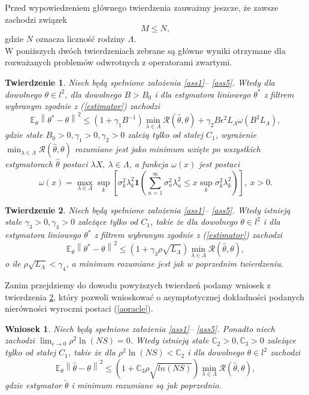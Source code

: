 \documentclass{mwart}
\newtheorem{tw}{Twierdzenie}
\newtheorem{wn}{Wniosek}
\newcommand{\norm}[1]{\left\lVert#1\right\rVert}
\begin{document}
Przed wypowiedzeniem głównego twierdzenia zauważmy jeszcze, że zawsze zachodzi związek
\begin{displaymath}
M\leq N,
\end{displaymath}
gdzie $N$ oznacza liczność rodziny $\Lambda$.\\
W poniższych dwóch twierdzeniach zebrane są główne wyniki otrzymane dla rozważanych problemów odwrotnych z operatorami zwartymi.
\begin{tw}\label{glowny1}
Niech będą spełnione założenia \ref{ass1}-- \ref{ass5}. Wtedy dla dowolnego $\theta\in l^2$, dla dowolnego $B>B_0$ i dla estymatora liniowego $\theta^*$ z filtrem wybranym zgodnie z (\ref{estimator}) zachodzi
\begin{displaymath}
\mathbb{E}_{\theta}\norm{\theta^*-\theta}^2\leq (1+\gamma_1B^{-1})\min_{\lambda\in \Lambda}\mathcal{R}(\hat{\theta},\theta)+\gamma_2B\epsilon^2L_{\Lambda}\omega(B^2L_{\Lambda}),
\end{displaymath}
gdzie stałe $B_0>0,\gamma_1>0,\gamma_2>0$ zależą tylko od stałej $C_1$, wyrażenie $\min_{\lambda\in \Lambda}\mathcal{R}(\hat{\theta},\theta)$ rozumiane jest jako minimum wzięte po wszystkich estymatorach $\hat{\theta}$ postaci $\lambda X,\ \lambda\in \Lambda$, a funkcja $\omega(x)$ jest postaci
\begin{displaymath}
\omega(x)=\max_{\lambda\in \Lambda}\sup_k\left[\sigma_k^2\lambda_k^2\pmb{1}\left(\sum_{n=1}^{\infty}\sigma_n^2\lambda_n^2\leq x \sup_k\sigma_k^2\lambda_k^2\right)\right],\ x>0.
\end{displaymath}
\end{tw}
\begin{tw}\label{glowny2}
Niech będą spełnione założenia \ref{ass1}-- \ref{ass5}. Wtedy istnieją stałe $\gamma_3>0,\gamma_4>0$ zależące tylko od $C_1$, takie że dla dowolnego $\theta\in l^2$ i dla estymatora liniowego $\theta^*$ z filtrem wybranym zgodnie z (\ref{estimator}) zachodzi
\begin{displaymath}
\mathbb{E}_{\theta}\norm{\theta^*-\theta}^2\leq (1+\gamma_3\rho\sqrt{L_{\Lambda}})\min_{\lambda\in \Lambda}\mathcal{R}(\hat{\theta},\theta),
\end{displaymath}
o ile $\rho\sqrt{L_{\Lambda}}<\gamma_4$, a minimum rozumiane jest jak w poprzednim twierdzeniu.
\end{tw}
Zanim przejdziemy do dowodu powyższych twierdzeń podamy wniosek z twierdzenia \ref{glowny2}, który pozwoli wnioskować o asymptotycznej dokładności podanych nierówności wyroczni postaci (\ref{aoracle}).
\begin{wn}
Niech będą spełnione założenia \ref{ass1}-- \ref{ass5}. Ponadto niech zachodzi $\lim_{\epsilon\to 0}\rho^2\ln(NS)=0$. Wtedy istnieją stałe $\mathbb{C}_2>0,\mathbb{C}_3>0$ zależące tylko od stałej $C_1$, takie że dla $\rho^2\ln(NS)<\mathbb{C}_2$ i dla dowolnego $\theta\in l^2$ zachodzi
\begin{displaymath}
\mathbb{E}_{\theta}\norm{\hat{\theta}-\theta}^2\leq \left(1+\mathbb{C}_3\rho\sqrt{ln(NS)}\right)\min_{\lambda\in \Lambda}\mathcal{R}(\hat{\theta},\theta),
\end{displaymath}
gdzie estymator $\tilde{\theta}$ i minimum rozumiane są jak poprzednio.
\end{wn}
\end{document}
